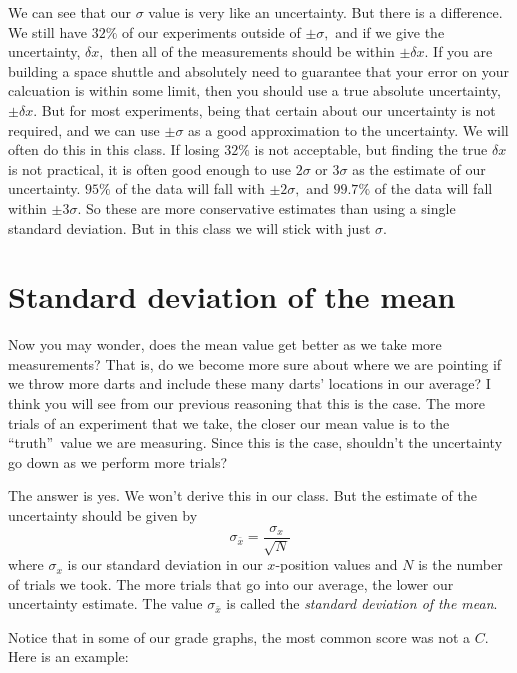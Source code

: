 \documentclass[twoside,11pt,ShortChapTitles]{BYUTextbook}
\begin{document}
We can see that our $\sigma $ value is very like an uncertainty. But there
is a difference. We still have $32\%$ of our experiments outside of $\pm
\sigma ,$ and if we give the uncertainty, $\delta x,$ then all of the
measurements should be within $\pm \delta x.$ If you are building a space
shuttle and absolutely need to guarantee that your error on your calcuation
is within some limit, then you should use a true absolute uncertainty, $\pm
\delta x.$ But for most experiments, being that certain about our
uncertainty is not required, and we can use $\pm \sigma $ as a good
approximation to the uncertainty. We will often do this in this class. If
losing $32\%$ is not acceptable, but finding the true $\delta x$ is not
practical, it is often good enough to use $2\sigma $ or $3\sigma $ as the
estimate of our uncertainty. $95\%$ of the data will fall with $\pm 2\sigma
, $ and $99.7\%$ of the data will fall within $\pm 3\sigma .$ So these are
more conservative estimates than using a single standard deviation. But in
this class we will stick with just $\sigma .$

\section{Standard deviation of the mean}

Now you may wonder, does the mean value get better as we take more
measurements? That is, do we become more sure about where we are pointing if
we throw more darts and include these many darts' locations in our average?
I think you will see from our previous reasoning that this is the case. The
more trials of an experiment that we take, the closer our mean value is to
the \textquotedblleft truth\textquotedblright\ value we are measuring. Since
this is the case, shouldn't the uncertainty go down as we perform more
trials?

The answer is yes. We won't derive this in our class. But the estimate of
the uncertainty should be given by
\[
\sigma _{\bar{x}}=\frac{\sigma _{x}}{\sqrt{N}}
\]%
where $\sigma _{x}$ is our standard deviation in our $x$-position values and
$N$ is the number of trials we took. The more trials that go into our
average, the lower our uncertainty estimate. The value $\sigma _{\bar{x}}$
is called the \emph{standard deviation of the mean}.

Notice that in some of our grade graphs, the most common score was not a $C.$
Here is an example:
\end{document}

